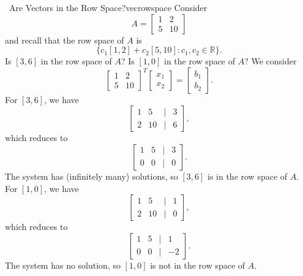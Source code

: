         \begin{example}{\Difficulty\,\Difficulty\,\,Are Vectors in the Row Space?}{vecrowspace}
            Consider
            \begin{equation*}
                A=\begin{bmatrix}
                    1 & 2 \\
                    5 & 10
                \end{bmatrix}
            \end{equation*} 
            and recall that the row space of \(A\) is 
            \begin{equation*}
                 \{c_1[1,2]+c_2[5,10]:c_1,c_2\in\mathbb{R}\}.
            \end{equation*}
            Is \([3,6]\) in the row space of \(A\)? Is \([1,0]\) in the row space of \(A\)? We consider
            \begin{equation*}
            \begin{bmatrix}
                1 & 2 \\
                5 & 10
            \end{bmatrix}^T\begin{bmatrix} x_1 \\ x_2 \end{bmatrix} = \begin{bmatrix} b_1 \\ b_2 \end{bmatrix}.
        \end{equation*}
        For \([3,6]\), we have
        \begin{equation*}
            \begin{bmatrix}
                1 & 5 & | & 3 \\
                2 & 10 & | & 6
            \end{bmatrix},
        \end{equation*}
        which reduces to
        \begin{equation*}
            \begin{bmatrix}
                1 & 5 & | & 3 \\
                0 & 0 & | & 0
            \end{bmatrix}.
        \end{equation*}
        The system has (infinitely many) solutions, so \([3,6]\) is in the row space of \(A\). For \([1,0]\), we have
        \begin{equation*}
            \begin{bmatrix}
                1 & 5 & | & 1 \\
                2 & 10 & | & 0
            \end{bmatrix},
        \end{equation*}
        which reduces to
        \begin{equation*}
            \begin{bmatrix}
                1 & 5 & | & 1 \\
                0 & 0 & | & -2
            \end{bmatrix}.
        \end{equation*}
        The system has no solution, so \([1,0]\) is not in the row space of \(A\).
        \end{example}
